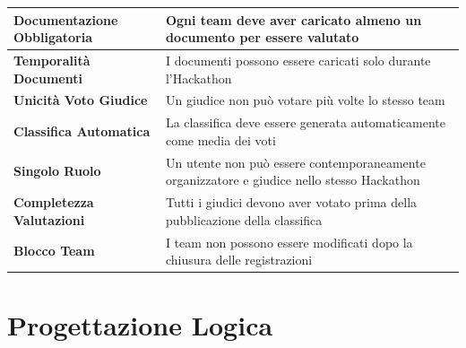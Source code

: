 \documentclass[a4paper, 10pt]{article}
\begin{document}
{\begin{longtable}{
				>{\raggedright\arraybackslash}p{5.5cm}
				>{\raggedright\arraybackslash}p{10cm}
			}
			\textbf{Documentazione Obbligatoria} &
			Ogni team deve aver caricato almeno un documento per essere valutato \\
			\hline
			
			\textbf{Temporalità Documenti} &
			I documenti possono essere caricati solo durante l'Hackathon\\
			\hline
			
			\textbf{Unicità Voto Giudice} &
			Un giudice non può votare più volte lo stesso team\\
			\hline
			
			\textbf{Classifica Automatica} &
			La classifica deve essere generata automaticamente come media dei voti\\
			\hline
			
			\textbf{Singolo Ruolo} &
			Un utente non può essere contemporaneamente organizzatore e giudice nello stesso Hackathon \\
			\hline
			
			\textbf{Completezza Valutazioni} &
			Tutti i giudici devono aver votato prima della pubblicazione della classifica \\
			\hline
			
			\textbf{Blocco Team} &
			I team non possono essere modificati dopo la chiusura delle registrazioni
		\end{longtable}
	}
	\newpage
	\section{Progettazione Logica}
\end{document}
